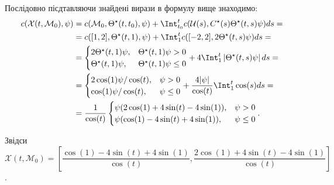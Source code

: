 \begin{solution}
    Послідовно пісдтавляючи знайдені вирази в формулу вище знаходимо:
    \begin{equation*}
    \begin{split}
        c(\mathcal{X}(t, \mathcal{M}_0), \psi) &= c(\mathcal{M}_0, \Theta^\star(t, t_0), \psi) + \Int_{t_0}^t c(\mathcal{U}(s), C^\star(s) \Theta^\star(t, s)\psi) ds = \\
        &= c([1,2], \Theta^\star(t, 1), \psi) + \Int_1^t c([-2, 2], 2\Theta^\star(t, s)\psi) ds = \\
        &= \begin{cases} 2\Theta^\star(t, 1)\psi, & \Theta^\star(t, 1)\psi > 0 \\ \Theta^\star(t, 1)\psi, & \Theta^\star(t, 1)\psi \le 0 \end{cases} + 4 \Int_1^t \left|\Theta^\star(t, s)\psi\right| ds = \\
        &= \begin{cases} 2\cos (1)\psi / \cos (t), & \psi > 0 \\ \cos (1) \psi / \cos (t), & \psi \le 0 \end{cases} + \dfrac{4 |\psi|}{\cos (t)} \Int_1^t \cos (s) ds = \\
        &= \dfrac{1}{\cos (t)} \begin{cases} \psi (2\cos(1) + 4\sin(t) - 4\sin(1)) , & \psi > 0 \\ \psi(\cos (1) - 4 \sin(t) + 4 \sin(1)) , & \psi \le 0 \end{cases}.
    \end{split}
    \end{equation*}
    
    Звідси $\mathcal{X}(t, \mathcal{M}_0) = \left[\dfrac{\cos (1) - 4 \sin(t) + 4 \sin(1)}{\cos(t)}, \dfrac{2\cos(1) + 4\sin(t) - 4\sin(1)}{\cos(t)}\right]$.

\end{solution}
